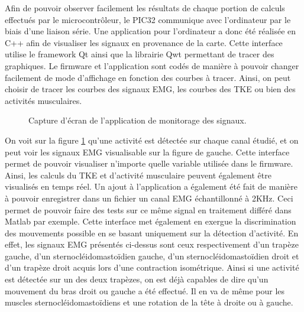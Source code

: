 \documentclass[letterpaper, twoside, 12pt, memoire, creativecommons, hyperref]{thETS}
\begin{document}
Afin de pouvoir observer facilement les résultats de chaque portion de calculs effectués par le microcontrôleur, le PIC32 communique avec l’ordinateur par le biais d’une liaison série. 
Une application pour l’ordinateur a donc été réalisée en C++ afin de visualiser les signaux en provenance de la carte. Cette interface utilise le framework Qt ainsi que la librairie Qwt permettant de tracer des graphiques. 
Le firmware et l’application sont codés de manière à pouvoir changer facilement de mode d’affichage en fonction des courbes à tracer. Ainsi, on peut choisir de tracer les courbes des signaux EMG, les courbes des TKE ou bien des activités musculaires.      

\begin{figure}
	\centering
	\caption{Capture d'écran de l'application de monitorage des signaux.}
	\label{fig:desktop1}
\end{figure}

On voit sur la figure \ref{fig:desktop1} qu’une activité est détectée sur chaque canal étudié, et on peut voir les signaux EMG visualisable sur la figure de gauche. Cette interface permet de pouvoir visualiser n’importe quelle variable utilisée dans le firmware. Ainsi, les calculs du TKE et d'activité musculaire peuvent également être visualisés en temps réel.
Un ajout à l’application a également été fait de manière à pouvoir enregistrer dans un fichier un canal EMG échantillonné à 2KHz. Ceci permet de pouvoir faire des tests sur ce même signal en traitement différé dans Matlab par exemple.
Cette interface met également en exergue la discrimination des mouvements possible en se basant uniquement sur la détection d’activité. En effet, les signaux EMG présentés ci-dessus sont ceux respectivement d’un trapèze gauche, d’un sternocléidomastoïdien gauche, d’un sternocléidomastoïdien droit et d’un trapèze droit acquis lors d’une contraction isométrique. Ainsi si une activité est détectée sur un des deux trapèzes, on est déjà capables de dire qu’un mouvement du bras droit ou gauche a été effectué. Il en va de même pour les muscles sternocléidomastoïdiens et une rotation de la tête à droite ou à gauche. 
\end{document}
